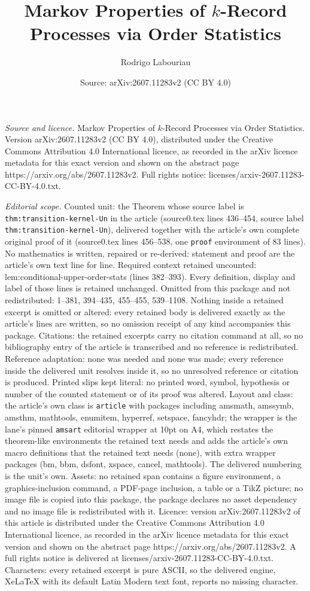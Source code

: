 \documentclass[10pt,a4paper]{amsart}
\title[Markov Properties of $k$-Record Processes via Order Statisti]{Markov Properties of $k$-Record Processes via Order Statistics}
\author{Rodrigo Labouriau}
\date{Source: arXiv:2607.11283v2 (CC BY 4.0)}
\begin{document}
\maketitle

\noindent\emph{Source and licence.} Markov Properties of $k$-Record Processes via Order Statistics. Version arXiv:2607.11283v2 (CC BY 4.0), distributed under the Creative Commons Attribution 4.0 International licence, as recorded in the arXiv licence metadata for this exact version and shown on the abstract page https://arxiv.org/abs/2607.11283v2. Full rights notice: licenses/arxiv-2607.11283-CC-BY-4.0.txt.\par\smallskip

\noindent\textit{Editorial scope.} Counted unit: the Theorem whose source label is \texttt{thm:transition-kernel-Un} in the article (source0.tex lines 436--454, source label \texttt{thm:transition-kernel-Un}), delivered together with the article's own complete original proof of it (source0.tex lines 456--538, one \texttt{proof} environment of 83 lines). No mathematics is written, repaired or re-derived: statement and proof are the article's own text line for line. Required context retained uncounted: lem:conditional-upper-order-stats (lines 382--393). Every definition, display and label of those lines is retained unchanged. Omitted from this package and not redistributed: 1--381, 394--435, 455--455, 539--1108. Nothing inside a retained excerpt is omitted or altered: every retained body is delivered exactly as the article's lines are written, so no omission receipt of any kind accompanies this package. Citations: the retained excerpts carry no citation command at all, so no bibliography entry of the article is transcribed and no reference is redistributed. Reference adaptation: none was needed and none was made; every reference inside the delivered unit resolves inside it, so no unresolved reference or citation is produced. Printed slips kept literal: no printed word, symbol, hypothesis or number of the counted statement or of its proof was altered. Layout and class: the article's own class is \texttt{article} with packages including amsmath, amssymb, amsthm, mathtools, enumitem, hyperref, setspace, fancyhdr; the wrapper is the lane's pinned \texttt{amsart} editorial wrapper at 10pt on A4, which restates the theorem-like environments the retained text needs and adds the article's own macro definitions that the retained text needs (none), with extra wrapper packages (bm, bbm, dsfont, xspace, cancel, mathtools). The delivered numbering is the unit's own. Assets: no retained span contains a figure environment, a graphics-inclusion command, a PDF-page inclusion, a table or a TikZ picture; no image file is copied into this package, the package declares no asset dependency and no image file is redistributed with it. Licence: version arXiv:2607.11283v2 of this article is distributed under the Creative Commons Attribution 4.0 International licence, as recorded in the arXiv licence metadata for this exact version and shown on the abstract page https://arxiv.org/abs/2607.11283v2. A full rights notice is delivered at licenses/arxiv-2607.11283-CC-BY-4.0.txt. Characters: every retained excerpt is pure ASCII, so the delivered engine, XeLaTeX with its default Latin Modern text font, reports no missing character.
\end{document}
